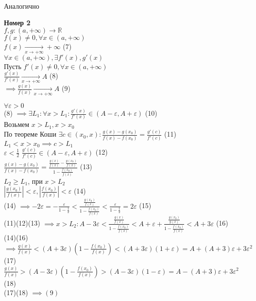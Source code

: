 \begin{replacementproof}
	Аналогично
\end{replacementproof}
\begin{theorem}\textbf{Номер 2}\\
	$f,g: (a,+\infty) \to \mathbb{R}$ \\
	$f(x)\neq 0, \forall x \in (a,+\infty)$ \\
	$f(x)\underset{x\to +\infty}{\to} +\infty$ (7)\\
	$\forall x \in (a, +\infty), \exists f'(x),g'(x)$ \\
	 Пусть $f'(x)\neq 0, \forall x \in (a,+\infty)$ \\
	 $\displaystyle\frac{g'(x)}{f'(x)}\underset{x\to +\infty}{\to}A$ (8)\\
	 $\implies \displaystyle\frac{g(x)}{f(x)}\underset{x\to +\infty}{\to} A$ (9)
\end{theorem}
\begin{replacementproof}
	$\forall \varepsilon >0$\\
	(8) $\implies \exists L_1: \forall x>L_1: \displaystyle\frac{g'(x)}{f'(x)}\in (A-\varepsilon,A+\varepsilon)$ (10)\\
	Возьмем $x>L_1, x>x_0$\\
	По теореме Коши $\exists c \in (x_0,x): \displaystyle\frac{g(x)-g(x_0)}{f(x)-f(x_0)}=\displaystyle\frac{g'(c)}{f'(c)}$ (11)\\
	$L_1<x>x_0 \implies c>L_1$\\
	$\varepsilon < \displaystyle\frac{1}{2}$
	$\displaystyle\frac{g'(c)}{f'(c)}\in(A-\varepsilon,A+\varepsilon)$ (12)\\
	$\displaystyle\frac{g(x)-g(x_0)}{f(x)-f(x_0)}=\displaystyle\frac{\displaystyle\frac{g(x)}{f(x)}-\displaystyle\frac{g(x_0)}{f(x)}}{1-\displaystyle\frac{f(x_0)}{f(x)}}$ (13)\\
	$L_2\ge L_1$, при $x>L_2$\\
	$|\displaystyle\frac{g(x_0)}{f(x)}|<\varepsilon, |\displaystyle\frac{f(x_0)}{f(x)}|<\varepsilon$ (14)\\
	(14) $\implies -2\varepsilon=-\displaystyle\frac{\varepsilon}{1-\displaystyle\frac{1}{2}}<\displaystyle\frac{\displaystyle\frac{g(x_0)}{f(x)}}{1-\displaystyle\frac{f(x_0)}{f(x)}}<\displaystyle\frac{\varepsilon}{1-\displaystyle\frac{1}{2}}=2\varepsilon$ (15)\\
	(11)(12)(13) $\implies x>L_2: A-3\varepsilon<\displaystyle\frac{\displaystyle\frac{g(x)}{f(x)}}{1-\displaystyle\frac{f(x_0)}{f(x)}}<A+\varepsilon+\displaystyle\frac{\displaystyle\frac{g(x_0)}{g(x)}}{1-\displaystyle\frac{f(x_0)}{f(x)}}<A+3\varepsilon$ (16)\\
	(14)(16) $\implies \displaystyle\frac{g(x)}{f(x)}<(A+3\varepsilon)(1-\displaystyle\frac{f(x_0)}{f(x)})<(A+3\varepsilon)(1+\varepsilon)=A+(A+3)\varepsilon+3\varepsilon^2$ (17)\\
	$\displaystyle\frac{g(x)}{f(x)}>(A-3\varepsilon)(1-\displaystyle\frac{f(x_0)}{f(x)})>(A-3\varepsilon)(1-\varepsilon)=A-(A+3)\varepsilon+3\varepsilon ^2$ (18)\\
	(17)(18) $\implies (9)$
\end{replacementproof}
